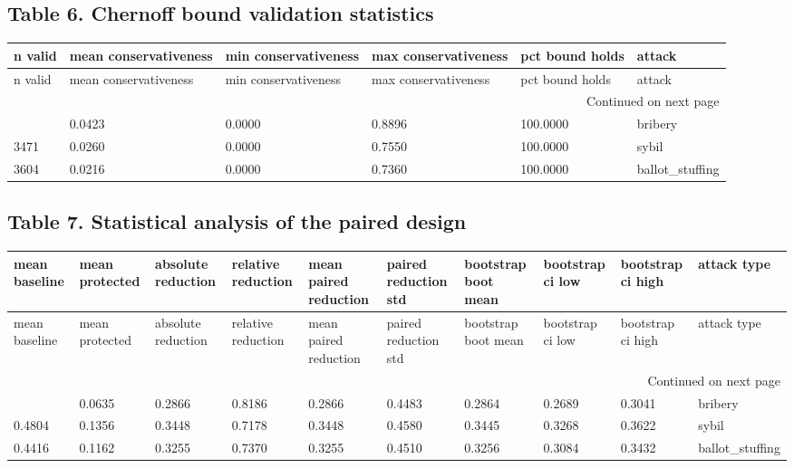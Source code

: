 \documentclass[11pt,a4paper]{article}
\begin{document}
\subsection*{Table 6. Chernoff bound validation statistics}
{\scriptsize
\setlength{\tabcolsep}{3pt}
\begin{longtable}{llllll}
\toprule
n valid & mean conservativeness & min conservativeness & max conservativeness & pct bound holds & attack \\
\midrule
\endfirsthead
\toprule
n valid & mean conservativeness & min conservativeness & max conservativeness & pct bound holds & attack \\
\midrule
\endhead
\midrule
\multicolumn{6}{r}{Continued on next page} \\
\midrule
\endfoot
\bottomrule
\endlastfoot
1088 & 0.0423 & 0.0000 & 0.8896 & 100.0000 & bribery \\
3471 & 0.0260 & 0.0000 & 0.7550 & 100.0000 & sybil \\
3604 & 0.0216 & 0.0000 & 0.7360 & 100.0000 & ballot\_stuffing \\
\end{longtable}

}
\vspace{8pt}
\begin{landscape}
\subsection*{Table 7. Statistical analysis of the paired design}
{\tiny
\setlength{\tabcolsep}{3pt}
\begin{longtable}{llllllllll}
\toprule
mean baseline & mean protected & absolute reduction & relative reduction & mean paired reduction & paired reduction std & bootstrap boot mean & bootstrap ci low & bootstrap ci high & attack type \\
\midrule
\endfirsthead
\toprule
mean baseline & mean protected & absolute reduction & relative reduction & mean paired reduction & paired reduction std & bootstrap boot mean & bootstrap ci low & bootstrap ci high & attack type \\
\midrule
\endhead
\midrule
\multicolumn{10}{r}{Continued on next page} \\
\midrule
\endfoot
\bottomrule
\endlastfoot
0.3501 & 0.0635 & 0.2866 & 0.8186 & 0.2866 & 0.4483 & 0.2864 & 0.2689 & 0.3041 & bribery \\
0.4804 & 0.1356 & 0.3448 & 0.7178 & 0.3448 & 0.4580 & 0.3445 & 0.3268 & 0.3622 & sybil \\
0.4416 & 0.1162 & 0.3255 & 0.7370 & 0.3255 & 0.4510 & 0.3256 & 0.3084 & 0.3432 & ballot\_stuffing \\
\end{longtable}

}
\end{landscape}
\end{document}
